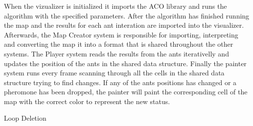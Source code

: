 \documentclass[times, 10pt,twocolumn]{article}
\begin{document}
        When the vizualizer is initialized it imports the ACO library and runs the algorithm 
    with the specified parameters. After the algorithm has finished running the map and
    the results for each ant interation are imported into the visualizer. Afterwards, the Map Creator
    system is responsible for importing, interpreting and converting the map it into a format that is 
    shared throughout the other systems. The Player system reads the results from the ants iterativelly
    and updates the position of the ants in the shared data structure. Finally the painter system
    runs every frame scanning through all the cells in the shared data structure trying to find
    changes. If any of the ants positions has changed or a pheromone has been dropped, the painter
    will paint the corresponding cell of the map with the correct color to represent the new status.

	Loop Deletion

\end{document}
